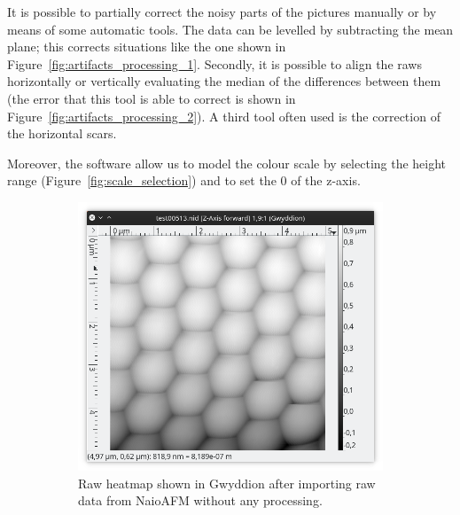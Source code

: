 \documentclass[11pt,a4paper]{article}
\begin{document}
It is possible to partially correct the noisy parts of the pictures manually or by means of some automatic tools. The data can be levelled by subtracting the mean plane; this corrects situations like the one shown in Figure~\ref{fig:artifacts_processing_1}. Secondly, it is possible to align the raws horizontally or vertically evaluating the median of the differences between them (the error that this tool is able to correct is shown in Figure~\ref{fig:artifacts_processing_2}). A third tool often used is the correction of the horizontal scars.

Moreover, the software allow us to model the colour scale by selecting the height range (Figure~\ref{fig:scale_selection}) and to set the 0 of the z-axis.

\begin{figure}[ht]
\centering
\begin{subfigure}[b]{0.45\textwidth}
\includegraphics[width=\textwidth]{heatmap_rawdata}
\caption{Raw heatmap shown in Gwyddion after importing raw data from NaioAFM without any processing.}
\label{fig:heatmap_rawdata}
\end{subfigure}
\begin{subfigure}[b]{0.45\textwidth}
\centering

\end{subfigure}
\end{figure}
\end{document}
